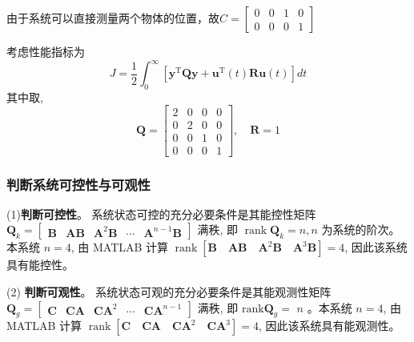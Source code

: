 \documentclass[UTF8]{ctexart}
\begin{document}
由于系统可以直接测量两个物体的位置，故$ C = \left[
  \begin{array}{llll}
    0 & 0 & 1 & 0 \\
    0 & 0 & 0 & 1 
  \end{array}\right] $

考虑性能指标为
$$
J=\frac{1}{2} \int_{0}^{\infty}\left[\boldsymbol{y}^{\mathrm{T}} \boldsymbol{Q} \boldsymbol{y}+\boldsymbol{u}^{\mathrm{T}}(t) \boldsymbol{R} \boldsymbol{u}(t)\right] d t
$$
其中取,
$$
\boldsymbol{Q}=\left[\begin{array}{llll}
2 & 0 & 0 & 0 \\
0 & 2 & 0 & 0 \\
0 & 0 & 1 & 0 \\
0 & 0 & 0 & 1
\end{array}\right], \quad \boldsymbol{R}=1
$$
  \subsubsection{判断系统可控性与可观性}
  \par (1)\textbf{判断可控性}。
系统状态可控的充分必要条件是其能控性矩阵 $\boldsymbol{Q}_{k}=\left[\begin{array}{lllll}\boldsymbol{B} & \boldsymbol{A} \boldsymbol{B} & \boldsymbol{A}^{2} \boldsymbol{B} & \cdots & \boldsymbol{A}^{n-1} \boldsymbol{B}\end{array}\right]$ 满秩, 即 $\operatorname{rank} \boldsymbol{Q}_{k}=n, n$ 为系统的阶次。本系统 $n=4$, 由 MATLAB 计算 $\operatorname{rank}\left[\boldsymbol{B} \quad \boldsymbol{A} \boldsymbol{B} \quad \boldsymbol{A}^{2} \boldsymbol{B} \quad \boldsymbol{A}^{3} \boldsymbol{B}\right]=4$, 因此该系统具有能控性。
  \par (2) \textbf{判断可观性}。
系统状态可观的充分必要条件是其能观测性矩阵 $\boldsymbol{Q}_{g}=\left[\begin{array}{lllll}\boldsymbol{C} & \boldsymbol{C A} & \boldsymbol{C} \boldsymbol{A}^{2} & \cdots & \boldsymbol{C} \boldsymbol{A}^{n-1}\end{array}\right]$ 满秩, 即 $\mathrm{rank} \boldsymbol{Q}_{g}=$ $n$ 。本系统 $n=4$, 由 MATLAB 计算 $\operatorname{rank}\left[\boldsymbol{C} \quad \boldsymbol{C A} \quad \boldsymbol{C A}^{2} \quad \boldsymbol{C A}^{3}\right]=4$, 因此该系统具有能观测性。
\end{document}
